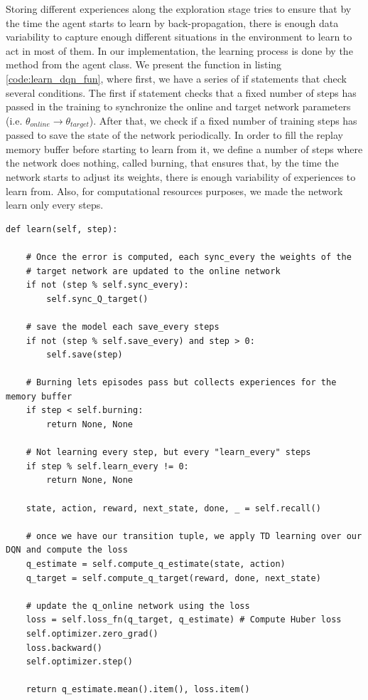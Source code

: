 Storing different experiences along the exploration stage tries to ensure that by the time the agent starts to learn by back-propagation, there is enough data variability to capture enough different situations in the environment to learn to act in most of them. In our implementation, the learning process is done by the  method from the agent class. We present the function in listing \ref{code:learn_dqn_fun}, where first, we have a series of if statements that check several conditions. The first if statement checks that a fixed number of steps has passed in the training to synchronize the online and target network parameters (i.e. $\theta_{online} \rightarrow \theta_{target}$). After that, we check if a fixed number of training steps has passed to save the state of the network periodically. In order to fill the replay memory buffer before starting to learn from it, we define a number of steps where the network does nothing, called burning, that ensures that, by the time the network starts to adjust its weights, there is enough variability of experiences to learn from. Also, for computational resources purposes, we made the network learn only every  steps.

\begin{lstlisting}[caption={\inlinecode{learn} function from the DQN agent}, label={code:learn_dqn_fun}]
def learn(self, step):
	
	# Once the error is computed, each sync_every the weights of the 
	# target network are updated to the online network
	if not (step % self.sync_every):
		self.sync_Q_target()
	
	# save the model each save_every steps
	if not (step % self.save_every) and step > 0:
		self.save(step)
	
	# Burning lets episodes pass but collects experiences for the memory buffer
	if step < self.burning:
		return None, None
	
	# Not learning every step, but every "learn_every" steps
	if step % self.learn_every != 0:
		return None, None
	
	state, action, reward, next_state, done, _ = self.recall()
	
	# once we have our transition tuple, we apply TD learning over our DQN and compute the loss
	q_estimate = self.compute_q_estimate(state, action)
	q_target = self.compute_q_target(reward, done, next_state)
	
	# update the q_online network using the loss
	loss = self.loss_fn(q_target, q_estimate) # Compute Huber loss
	self.optimizer.zero_grad()
	loss.backward()
	self.optimizer.step()
	
	return q_estimate.mean().item(), loss.item()
\end{lstlisting} 

